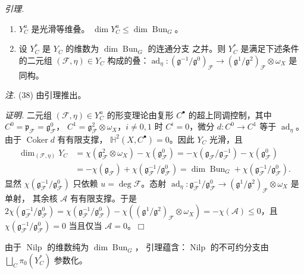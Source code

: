 \emph{引理.}
\begin{enumerate}[label=\arabic*),leftmargin=2.2em]
\item $Y_C^u$ 是光滑等维叠。
  $\dim Y_C^u\le\dim\operatorname{Bun}_G$。
\item 设 $Y_C^*$ 是 $Y_C$ 的维数为 $\dim\operatorname{Bun}_G$ 的连通分支
  之并。则 $Y_C^*$ 是满足下述条件的二元组 $(\mathcal{F},\eta)\in Y_C$
  构成的叠：$\operatorname{ad}_\eta:
  (\mathfrak{g}^{-1}/\mathfrak{g}^0)_{\mathcal{F}}\to
  (\mathfrak{g}^1/\mathfrak{g}^2)_{\mathcal{F}}\otimes\omega_X$
  是同构。
\end{enumerate}

\emph{注.} (38) 由引理推出。

\emph{证明.} 二元组 $(\mathcal{F},\eta)\in Y_C^u$ 的形变理论由复形
$C^{\bullet}$ 的超上同调控制，其中
$C^0=\mathfrak{p}_{\mathcal{F}}=\mathfrak{g}^0_{\mathcal{F}}$，
$C^1=\mathfrak{g}^2_{\mathcal{F}}\otimes\omega_X$，$i\ne 0,1$ 时
$C^i=0$，微分 $d:C^0\to C^1$ 等于 $\operatorname{ad}_\eta$。由于
$\operatorname{Coker}d$ 有有限支撑，
$\mathbb{H}^2(X,C^{\bullet})=0$。因此 $Y_C$ 光滑，且
\[
\begin{aligned}
\dim_{(\mathcal{F},\eta)}Y_C
&=\chi(\mathfrak{g}^2_{\mathcal{F}}\otimes\omega_X)
  -\chi(\mathfrak{g}^0_{\mathcal{F}})
 =-\chi(\mathfrak{g}_{\mathcal{F}}/\mathfrak{g}^{-1}_{\mathcal{F}})
  -\chi(\mathfrak{g}^0_{\mathcal{F}})\\
&=-\chi(\mathfrak{g}_{\mathcal{F}})
  +\chi(\mathfrak{g}^{-1}_{\mathcal{F}}/\mathfrak{g}^0_{\mathcal{F}})
 =\dim\operatorname{Bun}_G
  +\chi(\mathfrak{g}^{-1}_{\mathcal{F}}/\mathfrak{g}^0_{\mathcal{F}}).
\end{aligned}
\]
显然 $\chi(\mathfrak{g}^{-1}_{\mathcal{F}}/\mathfrak{g}^0_{\mathcal{F}})$
只依赖 $u=\deg\mathcal{F}$。态射 $\operatorname{ad}_\eta:
\mathfrak{g}^{-1}_{\mathcal{F}}/\mathfrak{g}^0_{\mathcal{F}}\to
(\mathfrak{g}^1/\mathfrak{g}^2)_{\mathcal{F}}\otimes\omega_X$ 是单射，
其余核 $\mathcal{A}$ 有有限支撑。于是
$2\chi(\mathfrak{g}^{-1}_{\mathcal{F}}/\mathfrak{g}^0_{\mathcal{F}})
=\chi(\mathfrak{g}^{-1}_{\mathcal{F}}/\mathfrak{g}^0_{\mathcal{F}})
-\chi((\mathfrak{g}^1/\mathfrak{g}^2)_{\mathcal{F}}\otimes\omega_X)
=-\chi(\mathcal{A})\le 0$，且
$\chi(\mathfrak{g}^{-1}_{\mathcal{F}}/\mathfrak{g}^0_{\mathcal{F}})=0$
当且仅当 $\mathcal{A}=0$。\hfill$\Box$


由于 $\operatorname{Nilp}$ 的维数纯为 $\dim\operatorname{Bun}_G$，
引理蕴含：$\operatorname{Nilp}$ 的不可约分支由
$\bigsqcup_C\pi_0(Y_C^*)$ 参数化。

